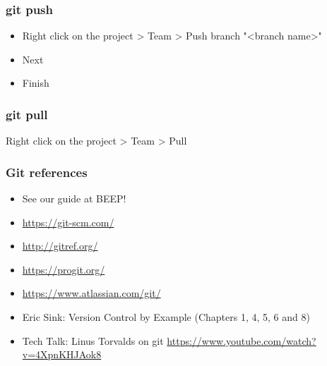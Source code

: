 \documentclass{beamer}
\begin{document}
\begin{frame}
\frametitle{git push}

\begin{itemize}
\item Right click on the project > Team > Push branch "<branch name>"
\item Next
\item Finish
\end{itemize}

\end{frame}

\begin{frame}
\frametitle{git pull}

Right click on the project > Team > Pull

\end{frame}



\begin{frame}
\frametitle{Git references}

\begin{itemize}
\item See our guide at BEEP!
\item \url{https://git-scm.com/}
\item \url{http://gitref.org/}
\item \url{https://progit.org/}
\item \url{https://www.atlassian.com/git/}
\item Eric Sink: Version Control by Example (Chapters 1, 4, 5, 6 and
  8)
\item Tech Talk: Linus Torvalds on git
\url{https://www.youtube.com/watch?v=4XpnKHJAok8}

\end{itemize}

\end{frame}
\end{document}

